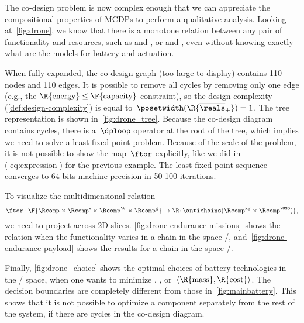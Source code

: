 The co-design problem is now complex enough that we can appreciate
the compositional properties of MCDPs to perform a qualitative analysis.
Looking at~\cref{fig:drone}, we know that there is a monotone relation
between any pair of functionality and resources, such as 
and , or  and , even without knowing
exactly what are the models for battery and actuation.

When fully expanded, the co-design graph (too large to display) contains
110 nodes and 110 edges. It is possible to remove all cycles by removing
only one edge (e.g., the $\R{\text{energy}}\leq\text{\F{\text{capacity}}}$
constraint), so the design complexity (\cref{def:design-complexity})
is equal to~$\posetwidth(\R{\overline{\reals}_{+}})=1$. The
tree representation is shown in~\cref{fig:drone_tree}. Because the
co-design diagram contains cycles, there is a~$\dploop$ operator
at the root of the tree, which implies we need to solve a least fixed
point problem. Because of the scale of the problem, it is not possible
to show the map~$\ftor$ explicitly, like we did in (\ref{eq:expression})
for the previous example. The least fixed point sequence converges
to 64 bits machine precision in 50-100 iterations.

To visualize the multidimensional relation
\[
  \ftor\colon\F{\Rcomp\times\Rcomp^{\text{s}}\times\Rcomp^{\text{W}}\times\Rcomp^{\text{g}}}\rightarrow\R{\antichains(\Rcomp^{\text{kg}}\times\Rcomp^{\USD})},
\]
we need to project across 2D slices. \cref{fig:drone-endurance-missions}~shows
the relation when the functionality varies in a chain in the space
/, and~\cref{fig:drone-endurance-payload}
shows the results for a chain in the space /.

Finally, \cref{fig:drone_choice} shows the optimal choices of battery
technologies in the / space, when one
wants to minimize , , or~$\left\langle \R{\text{mass}},\R{\text{cost}}\right\rangle $.
The decision boundaries are completely different from those in~\cref{fig:mainbattery}.
This shows that it is not possible to optimize a component separately
from the rest of the system, if there are cycles in the co-design
diagram.

